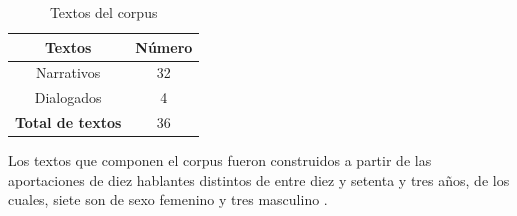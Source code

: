 \documentclass[letterpaper,12pt,oneside]{book}
\begin{document}
	
	\begin{table}

		\centering

		\begin{tabular}{ c | c }

			\textbf{Textos} & \textbf{Número} \\ \hline

			Narrativos & 32 \\

			Dialogados & 4  \\

			\textbf{Total de textos}  & 36 \\

		\end{tabular}

		\caption{Textos del corpus}

		\label{table_corpus_text:1}

	\end{table}

	
	Los textos que componen el corpus fueron construidos a partir de las aportaciones de diez hablantes distintos de entre diez y setenta y tres años, de los cuales, siete son de sexo femenino y tres masculino \citep{lastra1992otomi}. 

	


	


	




	
\end{document}
